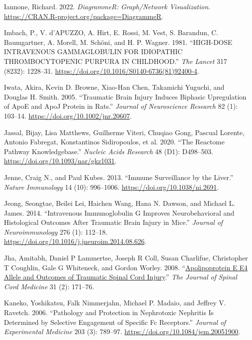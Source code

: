 \documentclass[9pt,lineno]{elife}
\newlength{\cslhangindent}
\newlength{\cslentryspacingunit} %
\newenvironment{CSLReferences}[2] %
 {%
  \setlength{\parindent}{0pt}
  \ifodd #1
  \let\oldpar\par
  \def\par{\hangindent=\cslhangindent\oldpar}
  \fi
  \setlength{\parskip}{#2\cslentryspacingunit}
 }%
 {}
\begin{document}
\begin{CSLReferences}{1}{0}
\leavevmode{}%
Iannone, Richard. 2022. \emph{DiagrammeR: Graph/Network Visualization}. \url{https://CRAN.R-project.org/package=DiagrammeR}.

\leavevmode{}%
Imbach, P., V. d'APUZZO, A. Hirt, E. Rossi, M. Vest, S. Barandun, C. Baumgartner, A. Morell, M. Schöni, and H. P. Wagner. 1981. {``{HIGH-DOSE INTRAVENOUS GAMMAGLOBULIN FOR IDIOPATHIC THROMBOCYTOPENIC PURPURA IN CHILDHOOD}.''} \emph{The Lancet} 317 (8232): 1228--31. \url{https://doi.org/10.1016/S0140-6736(81)92400-4}.

\leavevmode{}%
Iwata, Akira, Kevin D. Browne, Xiao-Han Chen, Takamichi Yuguchi, and Douglas H. Smith. 2005. {``Traumatic Brain Injury Induces Biphasic Upregulation of {ApoE} and {ApoJ} Protein in Rats.''} \emph{Journal of Neuroscience Research} 82 (1): 103--14. \url{https://doi.org/10.1002/jnr.20607}.

\leavevmode{}%
Jassal, Bijay, Lisa Matthews, Guilherme Viteri, Chuqiao Gong, Pascual Lorente, Antonio Fabregat, Konstantinos Sidiropoulos, et al. 2020. {``The Reactome Pathway Knowledgebase.''} \emph{Nucleic Acids Research} 48 (D1): D498--503. \url{https://doi.org/10.1093/nar/gkz1031}.

\leavevmode{}%
Jenne, Craig N., and Paul Kubes. 2013. {``Immune Surveillance by the Liver.''} \emph{Nature Immunology} 14 (10): 996--1006. \url{https://doi.org/10.1038/ni.2691}.

\leavevmode{}%
Jeong, Seongtae, Beilei Lei, Haichen Wang, Hana N. Dawson, and Michael L. James. 2014. {``Intravenous Immunoglobulin {G} Improves Neurobehavioral and Histological Outcomes After Traumatic Brain Injury in Mice.''} \emph{Journal of Neuroimmunology} 276 (1): 112--18. \url{https://doi.org/10.1016/j.jneuroim.2014.08.626}.

\leavevmode{}%
Jha, Amitabh, Daniel P Lammertse, Joseph R Coll, Susan Charlifue, Christopher T Coughlin, Gale G Whiteneck, and Gordon Worley. 2008. {``\href{https://www.ncbi.nlm.nih.gov/pmc/articles/PMC2565476}{Apolipoprotein {E E4 Allele} and {Outcomes} of {Traumatic Spinal Cord Injury}}.''} \emph{The Journal of Spinal Cord Medicine} 31 (2): 171--76.

\leavevmode{}%
Kaneko, Yoshikatsu, Falk Nimmerjahn, Michael P. Madaio, and Jeffrey V. Ravetch. 2006. {``Pathology and Protection in Nephrotoxic Nephritis Is Determined by Selective Engagement of Specific {Fc} Receptors.''} \emph{Journal of Experimental Medicine} 203 (3): 789--97. \url{https://doi.org/10.1084/jem.20051900}.


\end{CSLReferences}
\end{document}
